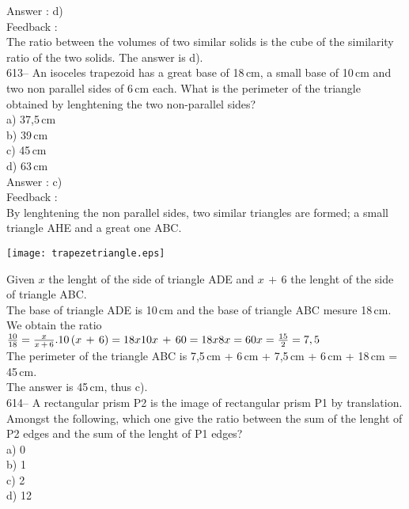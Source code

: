 \documentclass[letterpaper, 12pt]{article}
\begin{document}
Answer : d)\\

Feedback : \\
The ratio between the volumes of two similar solids is the cube of the similarity ratio of the two solids.
The answer is d).\\

613-- An isoceles trapezoid has a great base of 18\,cm, a small base of 10\,cm and two non parallel sides of 6\,cm each. 
What is the perimeter of the triangle obtained by lenghtening the two non-parallel sides?\\
a) 37,5\,cm\\
b) 39\,cm\\
c) 45\,cm\\
d) 63\,cm\\

Answer : c)\\

Feedback : \\
By lenghtening the non parallel sides, two similar triangles are formed; a small triangle AHE and a great one ABC.\\
    \begin{center}
    \texttt{[image: trapezetriangle.eps]}
    \end{center}

Given $x$ the lenght of the side of triangle ADE and $x\,+\,6$ the lenght of the side of triangle ABC.  \\
The base of triangle ADE is 10\,cm and the base of triangle ABC mesure
18\,cm.\\[2mm]
We obtain the ratio $\frac{10}{18}=\frac{x}{x\,+\,6}.\\[2mm]
10\left( x\,+\,6\right) =18x\\[2mm]
10x\,+\,60=18x\\[2mm]
8x=60\\[2mm]
x=\frac{15}{2}=7,5$\\[2mm]
The perimeter of the triangle ABC is 7,5\,cm + 6\,cm + 7,5\,cm + 6\,cm +
18\,cm = 45\,cm.\\[2mm]
The answer is 45\,cm, thus c).\\

614-- A rectangular prism P2 is the image of rectangular prism P1 by translation. Amongst the following, which one give the ratio between the sum of the lenght of P2 edges and the sum of the lenght of P1 edges?\\
a) 0\\
b) 1\\
c) 2\\
d) 12\\
\end{document}
